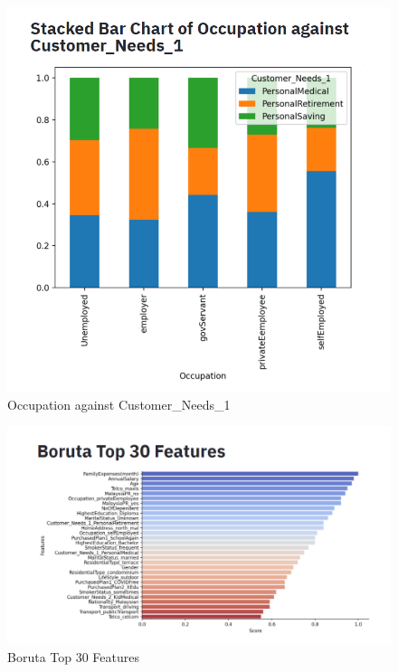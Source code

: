 \documentclass[11pt]{article}
\begin{document}
 \begin{figure}[H] 
     \centering
     \includegraphics[width=1.00\textwidth]{diagram5.png}
     \caption{Occupation against Customer\_Needs\_1}
     \label{fig:diagram5.png}
 \end{figure}
\vspace{0.3cm}

 \begin{figure}[H] 
     \centering
     \includegraphics[width=1.25\textwidth]{diagram6.png}
     \caption{Boruta Top 30 Features}
    \label{fig:diagram6.png}
 \end{figure}
\vspace{0.3cm}
\end{document}
